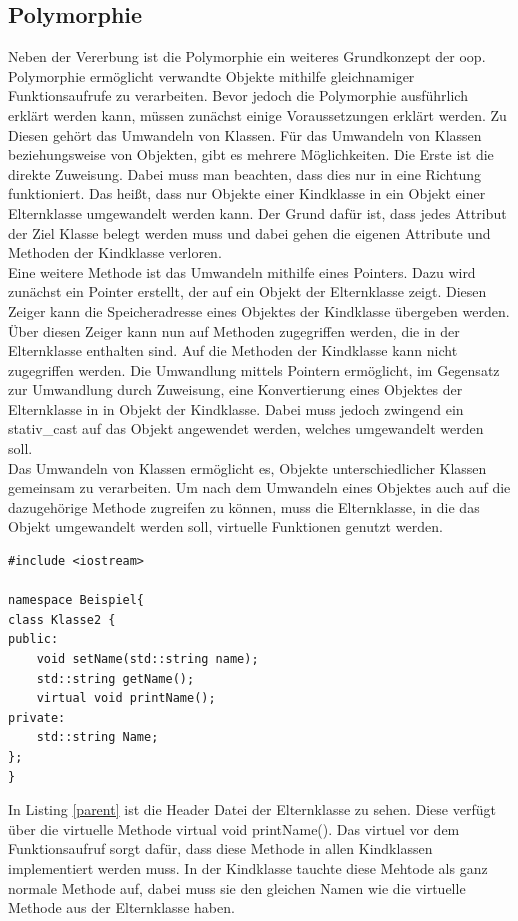\subsection{Polymorphie}\label{poly}
Neben der Vererbung ist die Polymorphie ein weiteres Grundkonzept der \ac{oop}. Polymorphie ermöglicht verwandte Objekte mithilfe gleichnamiger Funktionsaufrufe zu verarbeiten. Bevor jedoch die Polymorphie ausführlich erklärt werden kann, müssen zunächst einige Voraussetzungen erklärt werden.
Zu Diesen gehört das Umwandeln von Klassen. Für das Umwandeln von  Klassen beziehungsweise von Objekten, gibt es mehrere Möglichkeiten. Die Erste ist die direkte Zuweisung. Dabei muss man beachten, dass dies nur in eine Richtung funktioniert. Das heißt, dass nur Objekte einer Kindklasse in ein Objekt einer Elternklasse umgewandelt werden kann. Der Grund dafür ist, dass jedes Attribut der Ziel Klasse belegt werden muss und dabei gehen die eigenen  Attribute und Methoden  der Kindklasse verloren.\\
Eine weitere Methode ist das Umwandeln mithilfe eines Pointers.
Dazu wird zunächst ein Pointer erstellt, der auf ein Objekt der Elternklasse zeigt. Diesen Zeiger kann die Speicheradresse eines Objektes der Kindklasse übergeben werden. Über diesen Zeiger kann nun auf Methoden zugegriffen werden, die in der Elternklasse enthalten sind. Auf die Methoden der Kindklasse kann nicht zugegriffen werden. Die Umwandlung mittels Pointern ermöglicht, im Gegensatz zur Umwandlung durch Zuweisung, eine Konvertierung eines Objektes der Elternklasse in in Objekt der Kindklasse. Dabei muss jedoch zwingend ein \glqq stativ\_cast\grqq{} auf das Objekt angewendet werden, welches umgewandelt werden soll. \\
Das Umwandeln von Klassen ermöglicht es, Objekte unterschiedlicher Klassen gemeinsam zu verarbeiten. 
Um nach dem Umwandeln eines Objektes auch auf die dazugehörige Methode zugreifen zu können, muss die Elternklasse, in die das Objekt umgewandelt werden soll, virtuelle Funktionen genutzt werden. 
\begin{lstlisting}[caption = Klasse2.h,label=parent]
#include <iostream>

namespace Beispiel{
class Klasse2 {
public:
	void setName(std::string name);
	std::string getName();
	virtual void printName();
private:
	std::string Name;
};
}
\end{lstlisting}
In Listing  \ref{parent} ist die Header Datei der Elternklasse zu sehen. Diese verfügt über die virtuelle Methode \glqq virtual void printName()\grqq{}. Das 
\glqq virtuel\grqq{} vor dem Funktionsaufruf sorgt dafür, dass diese Methode in allen Kindklassen implementiert werden muss. In der Kindklasse tauchte diese Mehtode als ganz normale Methode auf, dabei muss sie den gleichen Namen wie die virtuelle Methode aus der Elternklasse haben.\\
